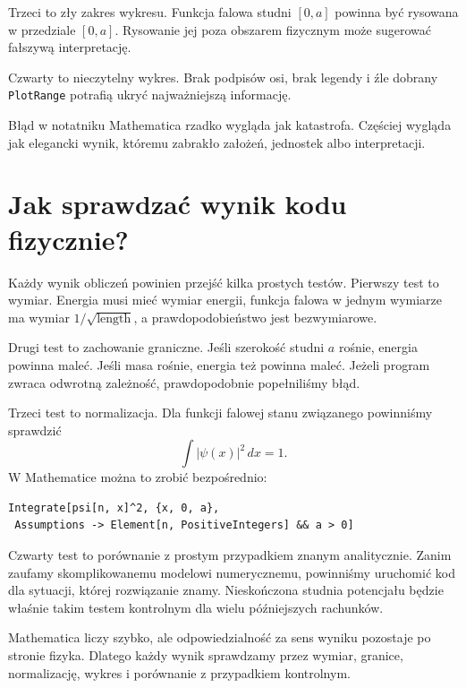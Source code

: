 Trzeci to zły zakres wykresu. Funkcja falowa studni \([0,a]\) powinna być rysowana w przedziale \([0,a]\). Rysowanie jej poza obszarem fizycznym może sugerować fałszywą interpretację.

Czwarty to nieczytelny wykres. Brak podpisów osi, brak legendy i źle dobrany \texttt{PlotRange} potrafią ukryć najważniejszą informację.

\begin{summarybox}
Błąd w notatniku Mathematica rzadko wygląda jak katastrofa. Częściej wygląda jak elegancki wynik, któremu zabrakło założeń, jednostek albo interpretacji.
\end{summarybox}

\section{Jak sprawdzać wynik kodu fizycznie?}

Każdy wynik obliczeń powinien przejść kilka prostych testów. Pierwszy test to wymiar. Energia musi mieć wymiar energii, funkcja falowa w jednym wymiarze ma wymiar \(1/\sqrt{\mathrm{length}}\), a prawdopodobieństwo jest bezwymiarowe.

Drugi test to zachowanie graniczne. Jeśli szerokość studni \(a\) rośnie, energia powinna maleć. Jeśli masa rośnie, energia też powinna maleć. Jeżeli program zwraca odwrotną zależność, prawdopodobnie popełniliśmy błąd.

Trzeci test to normalizacja. Dla funkcji falowej stanu związanego powinniśmy sprawdzić
\[
\int |\psi(x)|^2\,dx=1.
\]
W Mathematice można to zrobić bezpośrednio:
\begin{verbatim}
Integrate[psi[n, x]^2, {x, 0, a},
 Assumptions -> Element[n, PositiveIntegers] && a > 0]
\end{verbatim}

Czwarty test to porównanie z prostym przypadkiem znanym analitycznie. Zanim zaufamy skomplikowanemu modelowi numerycznemu, powinniśmy uruchomić kod dla sytuacji, której rozwiązanie znamy. Nieskończona studnia potencjału będzie właśnie takim testem kontrolnym dla wielu późniejszych rachunków.

\begin{summarybox}
Mathematica liczy szybko, ale odpowiedzialność za sens wyniku pozostaje po stronie fizyka. Dlatego każdy wynik sprawdzamy przez wymiar, granice, normalizację, wykres i porównanie z przypadkiem kontrolnym.
\end{summarybox}
